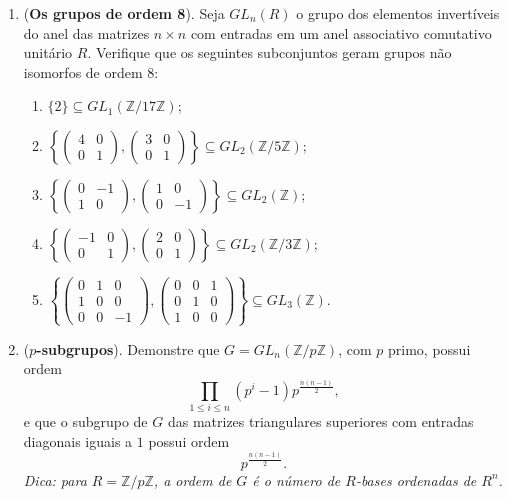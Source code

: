 \documentclass[a4paper,12pt]{article}
\begin{document}
\begin{enumerate}[label=12.\arabic*.]
    \item (\textbf{Os grupos de ordem 8}). Seja $GL_n(R)$ o grupo dos elementos invertíveis do anel das matrizes $n \times n$ com entradas em um anel associativo comutativo unitário $R$.  
    Verifique que os seguintes subconjuntos geram grupos não isomorfos de ordem 8:
    \begin{enumerate}[label=(\roman*)]
        \item $\{2\} \subseteq GL_1(\mathbb{Z}/17\mathbb{Z})$;
        \item $\left\{ \begin{pmatrix} 4 & 0 \\ 0 & 1 \end{pmatrix}, \begin{pmatrix} 3 & 0 \\ 0 & 1 \end{pmatrix} \right\} \subseteq GL_2(\mathbb{Z}/5\mathbb{Z})$;
        \item $\left\{ \begin{pmatrix} 0 & -1 \\ 1 & 0 \end{pmatrix}, \begin{pmatrix} 1 & 0 \\ 0 & -1 \end{pmatrix} \right\} \subseteq GL_2(\mathbb{Z})$;
        \item $\left\{ \begin{pmatrix} -1 & 0 \\ 0 & 1 \end{pmatrix}, \begin{pmatrix} 2 & 0 \\ 0 & 1 \end{pmatrix} \right\} \subseteq GL_2(\mathbb{Z}/3\mathbb{Z})$;
        \item $\left\{ \begin{pmatrix} 0&1&0 \\ 1&0&0 \\ 0&0&-1 \end{pmatrix}, \begin{pmatrix} 0&0&1 \\ 0&1&0 \\ 1&0&0 \end{pmatrix} \right\} \subseteq GL_3(\mathbb{Z})$.
    \end{enumerate}

    \item (\textbf{$p$-subgrupos}). Demonstre que $G=GL_n(\mathbb{Z}/p\mathbb{Z})$, com $p$ primo, possui ordem 
    \[
    \prod_{1 \leq i \leq n} (p^i - 1)p^{\frac{n(n-1)}{2}},
    \] 
    e que o subgrupo de $G$ das matrizes triangulares superiores com entradas diagonais iguais a $1$ possui ordem 
    \[
    p^{\frac{n(n-1)}{2}}.
    \] 
    \textit{Dica: para $R=\mathbb{Z}/p\mathbb{Z}$, a ordem de $G$ é o número de $R$-bases ordenadas de $R^n$.}

\end{enumerate}
\end{document}
